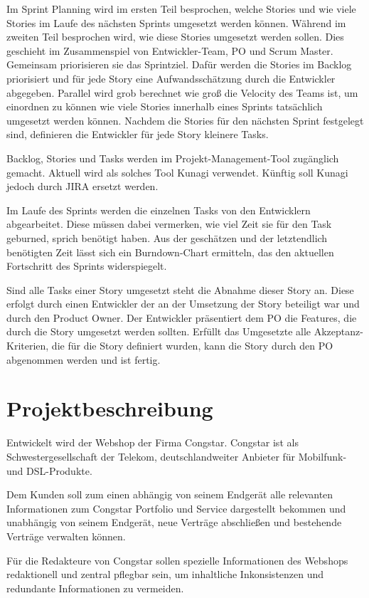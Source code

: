\documentclass[11pt,a4paper]{article} %
\begin{document}
Im Sprint Planning wird im ersten Teil besprochen, welche Stories und wie viele Stories 
im Laufe des nächsten Sprints umgesetzt werden können. Während im zweiten Teil
besprochen wird, wie diese Stories umgesetzt werden sollen.
Dies geschieht im Zusammenspiel von Entwickler-Team, PO und Scrum Master. Gemeinsam priorisieren sie das Sprintziel. 
Dafür werden die Stories im Backlog priorisiert und für jede Story eine
Aufwandsschätzung durch die Entwickler abgegeben.
Parallel wird grob berechnet wie groß die Velocity des Teams ist, um
einordnen zu können wie viele Stories innerhalb eines Sprints tatsächlich
umgesetzt werden können. Nachdem die Stories für den nächsten Sprint
festgelegt sind, definieren die Entwickler für jede Story kleinere Tasks.

Backlog, Stories und Tasks werden im Projekt-Management-Tool
zugänglich gemacht. Aktuell wird als solches Tool Kunagi verwendet. Künftig
soll Kunagi jedoch durch JIRA ersetzt werden.

Im Laufe des Sprints werden die einzelnen Tasks von den Entwicklern abgearbeitet.
Diese müssen dabei vermerken, wie viel Zeit sie für den Task geburned, sprich benötigt haben. Aus der
geschätzen und der letztendlich benötigten Zeit lässt sich ein Burndown-Chart
ermitteln, das den aktuellen Fortschritt des Sprints widerspiegelt.

Sind alle Tasks einer Story umgesetzt steht die Abnahme dieser Story an. Diese erfolgt 
durch einen Entwickler der an der Umsetzung der Story beteiligt war und durch den Product Owner. 
Der Entwickler präsentiert dem PO die Features, die durch die Story umgesetzt
werden sollten.
Erfüllt das Umgesetzte alle Akzeptanz-Kriterien, die für die Story definiert
wurden, kann die Story durch den PO abgenommen werden und ist fertig.

\section{Projektbeschreibung} \label{sec:projekt}


Entwickelt wird der Webshop der Firma Congstar. Congstar ist als Schwestergesellschaft der Telekom, 
deutschlandweiter Anbieter für Mobilfunk- und DSL-Produkte. 

Dem Kunden soll zum einen abhängig von seinem Endgerät alle relevanten
Informationen zum Congstar Portfolio und Service dargestellt bekommen und
unabhängig von seinem Endgerät, neue Verträge abschließen und bestehende
Verträge verwalten können.

Für die Redakteure von Congstar sollen spezielle Informationen des Webshops
redaktionell und zentral pflegbar sein, um inhaltliche Inkonsistenzen und redundante Informationen zu vermeiden. 
\end{document}
